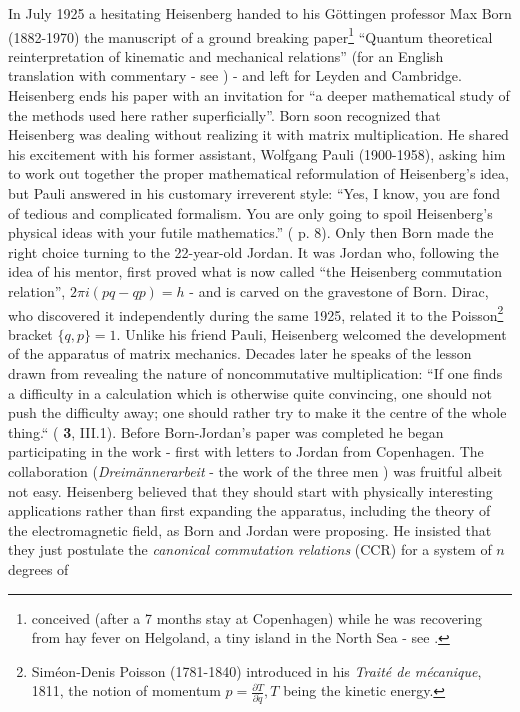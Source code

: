 \documentclass[12pt]{article}
\begin{document}
 In July 1925 a hesitating Heisenberg handed to his G\"ottingen professor Max
Born (1882-1970) the manuscript of a ground breaking paper\footnote{conceived
(after a 7 months stay at Copenhagen) while he was recovering from hay fever on
Helgoland, a tiny island in the North Sea - see \cite{T05}.}  ``Quantum
theoretical reinterpretation of kinematic and mechanical relations'' (for an
English translation with commentary - see \cite{SQM}) - and left for
Leyden and Cambridge. Heisenberg ends his paper with an invitation for ``a
deeper mathematical study of the methods used here rather superficially''. Born
 soon recognized that Heisenberg was dealing without realizing it with matrix
multiplication. He shared his excitement with his former assistant, Wolfgang
Pauli (1900-1958), asking him to work out together the proper mathematical
reformulation of Heisenberg's idea, but Pauli answered in his customary
irreverent style: ``Yes, I know, you are fond
of tedious and complicated formalism. You are only going to spoil Heisenberg's
physical ideas with your futile mathematics.'' (\cite{Sch} p. 8). Only then Born
 made the right choice turning to the 22-year-old Jordan. It was Jordan who,
following the idea of his mentor, first proved what is now called ``the
Heisenberg commutation
relation'', $2\pi i (pq - qp) = h$ - and is carved on the gravestone of Born.
 Dirac, who discovered it independently during the same 1925, related it to the
 Poisson\footnote{Sim\'eon-Denis Poisson (1781-1840) introduced in his {\it 
Trait\'e de m\'ecanique}, 1811, the notion of momentum $p = \frac{\partial T}
{\partial {\dot q}}, T$ being the kinetic energy.} bracket $\{q,p\} = 1$. 
Unlike his friend Pauli, Heisenberg welcomed the development of the apparatus of 
matrix mechanics. Decades later he speaks of the lesson drawn from revealing 
the nature of noncommutative multiplication: ``If one finds a difficulty in a 
calculation which is otherwise quite convincing,
one should not push the difficulty away; one should rather try to make it the
centre of the whole thing.``  (\cite{MR} {\bf 3}, III.1). Before Born-Jordan's
paper was completed he began participating in the work - first with letters to
Jordan from Copenhagen. The collaboration ({\it Dreim\"annerarbeit} - the work
of the three men \cite{BHJ}) was fruitful albeit not easy. Heisenberg believed
that they should start with physically interesting applications rather than
first expanding the apparatus, including the theory of the electromagnetic
field, as Born and Jordan were proposing. He insisted that they just postulate
the {\it canonical commutation relations} (CCR) for a system of $n$ degrees of
\end{document}
